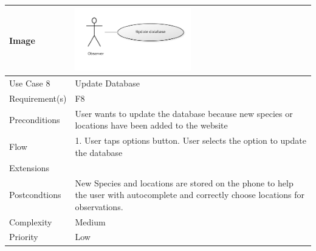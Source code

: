 \hspace{2em}


\begin{tabular}[t]{|l|p{}|}\hline
	Image&\includegraphics[width=0.5\textwidth]{reqspec/uc/updatedb.png} \\\hline
	Use Case 8&Update Database\\\hline
	Requirement(s)&F8\\\hline
	Preconditions&User wants to update the database because new species or
	locations have been added to the website\\\hline
	Flow&1. User taps options button\newline
	2. User selects the option to update the database\\\hline
	Extensions& \\\hline
	Postcondtions&New Species and locations are stored on the phone to help
	the user with autocomplete and correctly choose locations for observations.\\\hline
	Complexity&Medium\\\hline
	Priority&Low\\\hline
\end{tabular}
